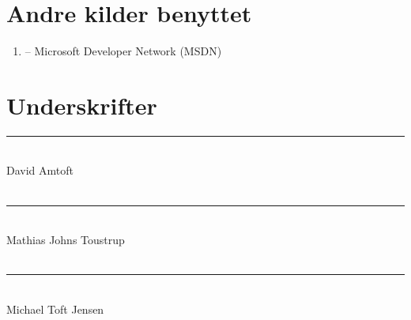 \documentclass[11pt]{article}
\begin{document}
\section{Andre kilder benyttet}
\begin{enumerate}
	\item[] -- Microsoft Developer Network (MSDN)
\end{enumerate}

\section{Underskrifter}
\vspace{2cm}
\rule{9cm}{1pt}\\
\vspace{1.5cm}
David Amtoft\\\\
\rule{9cm}{1pt}\\
\vspace{1.5cm}
Mathias Johns Toustrup\\\\
\rule{9cm}{1pt}\\
\vspace{1.5cm}
Michael Toft Jensen\\\\
\end{document}
